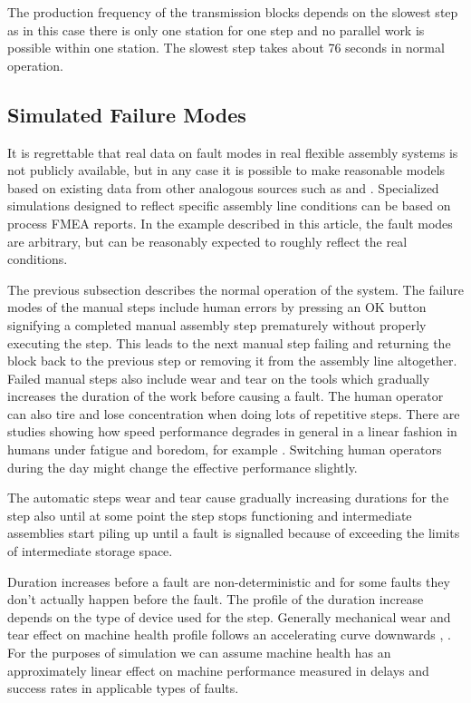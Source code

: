 \documentclass[procedia]{easychair}
\begin{document}
The production frequency of the transmission blocks depends on the slowest step as in this case there is only one station for one step and no
parallel work is possible within one station. The slowest step takes about 76 seconds in normal operation.

\subsection{Simulated Failure Modes}
It is regrettable that real data on fault modes in real flexible assembly systems is not publicly available, but in any case it is possible to make reasonable
models based on existing data from other analogous sources such as \cite{nasaames} and \cite{tsarouhas2009classification}. Specialized simulations designed
to reflect specific assembly line conditions can be based on process FMEA reports. In the example described in this article, the fault modes are arbitrary, but 
can be reasonably expected to roughly reflect the real conditions.

The previous subsection describes the normal operation of the system. The failure modes of the manual steps include human errors by pressing an OK button
signifying a completed manual assembly step prematurely without properly executing the step. This leads to the next manual step failing and
returning the block back to the previous step or removing it from the assembly line altogether.
Failed manual steps also include wear and tear
on the tools which gradually increases the duration of the work before causing a fault. The human operator can also tire and lose concentration
when doing lots of repetitive steps. There are studies showing how speed performance degrades in general in a linear fashion in humans
under fatigue and boredom, for example \cite{fatigue}. Switching human operators during the day might change the effective performance slightly.

The automatic steps wear and tear cause gradually increasing durations for the step also until at some point the step stops functioning and
intermediate assemblies start piling up until a fault is signalled because of exceeding the limits of intermediate storage space.

Duration increases before a fault are non-deterministic and for some faults they don't actually happen before the fault. The profile of the duration
increase depends on the type of device used for the step. Generally mechanical wear and tear effect on machine health profile follows
an accelerating curve downwards \cite{eker2012major}, \cite{milldataset}. For the purposes of simulation we can assume machine health has an approximately
linear effect on machine performance measured in delays and success rates in applicable types of faults.
\end{document}
